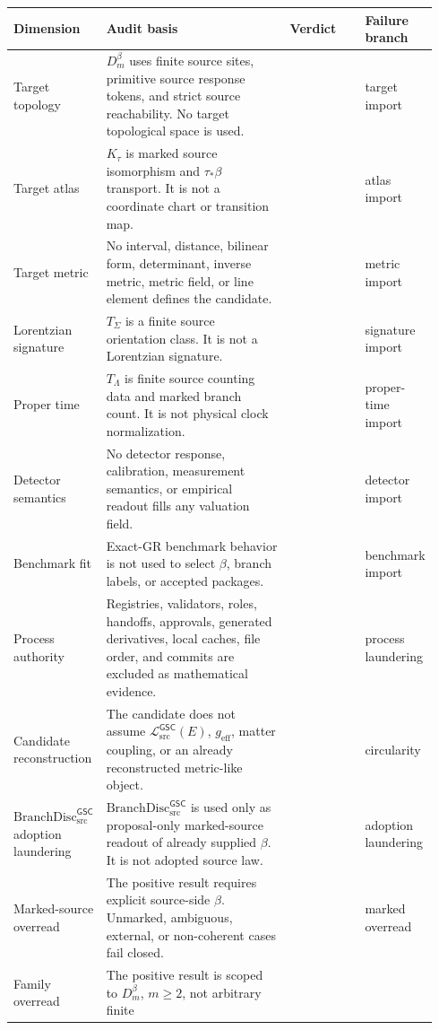 \documentclass[11pt]{article}
\newcommand{\MetricData}{\mathcal{L}_{\mathrm{src}}^{\mathsf{GSC}}}
\newcommand{\geff}{g_{\mathrm{eff}}}
\newcommand{\BranchDisc}{\mathrm{BranchDisc}_{\mathrm{src}}^{\mathsf{GSC}}}
\newcommand{\Dmbeta}{D_m^{\beta}}
\newcommand{\Pass}{\mathrm{pass\_no\_smuggling\_detected}}
\begin{document}
\begin{longtable}{p{0.19\linewidth}p{0.45\linewidth}p{0.18\linewidth}p{0.12\linewidth}}
\toprule
Dimension & Audit basis & Verdict & Failure branch \\
\midrule
Target topology &
\(\Dmbeta\) uses finite source sites, primitive source response tokens, and
strict source reachability. No target topological space is used. &
\Pass & target import \\
Target atlas &
\(K_\tau\) is marked source isomorphism and \(\tau_\ast\beta\) transport. It
is not a coordinate chart or transition map. &
\Pass & atlas import \\
Target metric &
No interval, distance, bilinear form, determinant, inverse metric, metric
field, or line element defines the candidate. &
\Pass & metric import \\
Lorentzian signature &
\(T_\Sigma\) is a finite source orientation class. It is not a Lorentzian
signature. &
\Pass & signature import \\
Proper time &
\(T_\Lambda\) is finite source counting data and marked branch count. It is
not physical clock normalization. &
\Pass & proper-time import \\
Detector semantics &
No detector response, calibration, measurement semantics, or empirical
readout fills any valuation field. &
\Pass & detector import \\
Benchmark fit &
Exact-GR benchmark behavior is not used to select \(\beta\), branch labels,
or accepted packages. &
\Pass & benchmark import \\
Process authority &
Registries, validators, roles, handoffs, approvals, generated derivatives,
local caches, file order, and commits are excluded as mathematical evidence. &
\Pass & process laundering \\
Candidate reconstruction &
The candidate does not assume \(\MetricData(E)\), \(\geff\), matter coupling,
or an already reconstructed metric-like object. &
\Pass & circularity \\
\(\BranchDisc\) adoption laundering &
\(\BranchDisc\) is used only as proposal-only marked-source readout of
already supplied \(\beta\). It is not adopted source law. &
\Pass & adoption laundering \\
Marked-source overread &
The positive result requires explicit source-side \(\beta\). Unmarked,
ambiguous, external, or non-coherent cases fail closed. &
\Pass & marked overread \\
Family overread &
The positive result is scoped to \(\Dmbeta\), \(m\ge2\), not arbitrary finite

\end{longtable}
\end{document}

